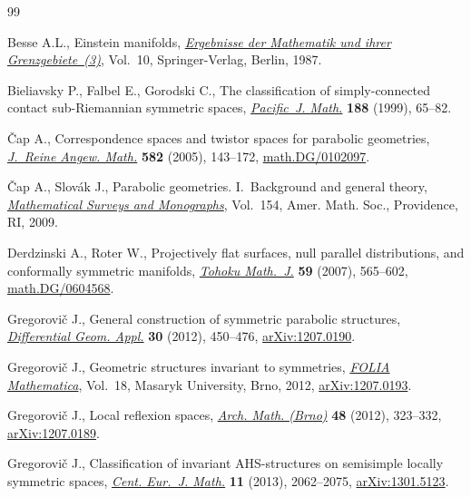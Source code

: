 \documentclass[pdftex]{sigma}
\numberwithin{equation}{section}
\begin{document}
\begin{thebibliography}{99}
\footnotesize\itemsep=0pt

Besse A.L., Einstein manifolds, \href{https://doi.org/10.1007/978-3-540-74311-8}{\textit{Ergebnisse der Mathematik und ihrer
 Grenzgebiete~(3)}}, Vol.~10, Springer-Verlag, Berlin, 1987.

Bieliavsky P., Falbel E., Gorodski C., The classif\/ication of simply-connected
 contact sub-{R}iemannian symmetric spaces, \href{https://doi.org/10.2140/pjm.1999.188.65}{\textit{Pacific~J. Math.}}
 \textbf{188} (1999), 65--82.

\v{C}ap A., Correspondence spaces and twistor spaces for parabolic geometries,
 \href{https://doi.org/10.1515/crll.2005.2005.582.143}{\textit{J.~Reine Angew. Math.}} \textbf{582} (2005), 143--172,
 \href{http://arxiv.org/abs/math.DG/0102097}{math.DG/0102097}.

\v{C}ap A., Slov\'ak J., Parabolic geometries. {I}.~Background and general
 theory, \href{https://doi.org/10.1090/surv/154}{\textit{Mathematical Surveys and Monographs}}, Vol.~154, Amer. Math.
 Soc., Providence, RI, 2009.

Derdzinski A., Roter W., Projectively f\/lat surfaces, null parallel
 distributions, and conformally symmetric manifolds, \href{https://doi.org/10.2748/tmj/1199649875}{\textit{Tohoku Math.~J.}}
 \textbf{59} (2007), 565--602, \href{http://arxiv.org/abs/math.DG/0604568}{math.DG/0604568}.

Gregorovi\v{c} J., General construction of symmetric parabolic structures,
 \href{https://doi.org/10.1016/j.difgeo.2012.06.006}{\textit{Differential Geom. Appl.}} \textbf{30} (2012), 450--476,
 \href{http://arxiv.org/abs/1207.0190}{arXiv:1207.0190}.

Gregorovi\v{c} J., Geometric structures invariant to symmetries, \href{https://doi.org/10.5817/CZ.MUNI.M210-6010-2012}{\textit{FOLIA
 Mathematica}}, Vol.~18, Masaryk University, Brno, 2012, \href{http://arxiv.org/abs/1207.0193}{arXiv:1207.0193}.

Gregorovi\v{c} J., Local ref\/lexion spaces, \href{https://doi.org/10.5817/AM2012-5-323}{\textit{Arch. Math. (Brno)}}
 \textbf{48} (2012), 323--332, \href{http://arxiv.org/abs/1207.0189}{arXiv:1207.0189}.

Gregorovi\v{c} J., Classif\/ication of invariant {AHS}-structures on semisimple
 locally symmetric spaces, \href{https://doi.org/10.2478/s11533-013-0318-5}{\textit{Cent. Eur.~J. Math.}} \textbf{11} (2013),
 2062--2075, \href{http://arxiv.org/abs/1301.5123}{arXiv:1301.5123}.


\end{thebibliography}
\end{document}
